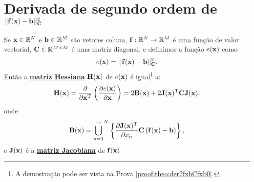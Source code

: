 
\section{Derivada de segundo ordem de $||\VECTOR{f}(\VECTOR{x})-\VECTOR{b}||_{\MATRIX{C}}^2$ 
}



\begin{theorem}\label{theo:der2fxbCfxb0}
Se
$\VECTOR{x}\in \mathbb{R}^N$ e 
$\VECTOR{b}\in \mathbb{R}^M$ são vetores coluna,  
$\VECTOR{f}: \mathbb{R}^{N}\rightarrow \mathbb{R}^{M}$ é uma função de valor vectorial,
$\MATRIX{C} \in \mathbb{R}^{M\times M}$ é uma matriz diagonal, e
definimos a função $e(\VECTOR{x})$ como
\begin{equation}
e(\VECTOR{x})= ||\VECTOR{f}(\VECTOR{x})-\VECTOR{b}||_{\MATRIX{C}}^2.
\end{equation}
Então a \hyperref[def:hessian]{\textbf{matriz Hessiana}} $\MATRIX{H}(\VECTOR{x})$ 
de $e(\VECTOR{x})$ é igual\footnote{A demostração pode ser vista na Prova \ref{proof:theo:der2fxbCfxb0}.} a:
\begin{equation}
\MATRIX{H}(\VECTOR{x}) = \frac{\partial}{\partial \VECTOR{x}^{\transpose}}\left(  
\frac{\partial e(\VECTOR{x}) }{\partial \VECTOR{x}} \right) = 2 \MATRIX{B}(\VECTOR{x})
+2 \MATRIX{J}(\VECTOR{x})^{\transpose}\MATRIX{C} \MATRIX{J}(\VECTOR{x}),
\end{equation}
onde 
\begin{equation}
 \MATRIX{B}(\VECTOR{x})=
{\bigcup\limits_{n=1}^{ \rightarrow }}^{N}\left\{ \frac{\partial \MATRIX{J}(\VECTOR{x})^{\transpose} }{\partial x_{n}} \MATRIX{C} \left( \VECTOR{f}(\VECTOR{x})-\VECTOR{b}\right) \right\},
\end{equation}
e $\MATRIX{J}(\VECTOR{x})$ é a \hyperref[def:jacobian]{\textbf{matriz Jacobiana}} de $\VECTOR{f}(\VECTOR{x})$
\end{theorem}

